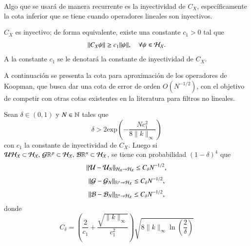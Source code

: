 Algo que se usará de manera recurrente es la inyectividad de $C_X$, específicamente la cota inferior que se tiene cuando operadores lineales son inyectivos.

\begin{lema}
    $C_X$ es inyectivo; de forma equivalente, existe una constante $c_1 > 0$ tal que
    \[
    \| C_X \psi \| \geq c_1 \| \psi \|, \quad \forall \psi \in \mathcal{H}_{\mathcal{X}}.
    \]
    A la constante $c_1$ se le denotará la constante de inyectividad de $C_X$.
\end{lema}


A continuación se presenta la cota para aproximación de los operadores de Koopman, que busca dar una cota de error de orden $O(N^{-1/2})$, con el objetivo de competir con otras cotas existentes en la literatura para filtros no lineales.

\begin{teo}
\label{teo:error_koop_sqrt_N_def}
Sean $\delta \in (0, 1)$ y $N \in \mathbb{N}$ tales que
\[
\delta > 2 \text{exp} \left ( -\frac{Nc_1^2}{8\|k\|_\infty}\right )
\]
con $c_1$ la constante de inyectividad de $C_X$. Luego si $\mathcal{U} \mathcal{H}_{\mathcal{X}} \subset \mathcal{H}_{\mathcal{X}}, \, \mathcal{G} \mathbb{R}^p \subset \mathcal{H}_{\mathcal{X}}, \, \mathcal{B} \mathbb{R}^n \subset \mathcal{H}_{\mathcal{X}}$, se tiene con probabilidad $(1-\delta)^4$ que 
 \begin{equation}
    \| \mathcal{U} - \mathcal{U}_N \|_{\mathcal{H}_{\mathcal{X}} \to \mathcal{H}_{\mathcal{X}}} \leq C_\delta N^{-1/2},
    \label{eq:kEDMD_bound}
\end{equation}
\begin{equation*}
\| \mathcal{G} - \mathcal{G}_N \|_{\mathbb{R}^p \to \mathcal{H}_{\mathcal{X}}} \leq C_\delta N^{-1/2},
\end{equation*}
\begin{equation*}
\| \mathcal{B} - \mathcal{B}_N \|_{\mathbb{R}^n \to \mathcal{H}_{\mathcal{X}}} \leq C_\delta N^{-1/2},
\end{equation*}
donde 
\[
C_\delta = \left ( \frac{2}{c_1} + \frac{\sqrt{\| k \|_{\infty}}}{c_1^2}
  \right )\sqrt{8 \| k \|_\infty \ln \left ( \frac{2}{\delta}\right ) }
\]
\end{teo}


